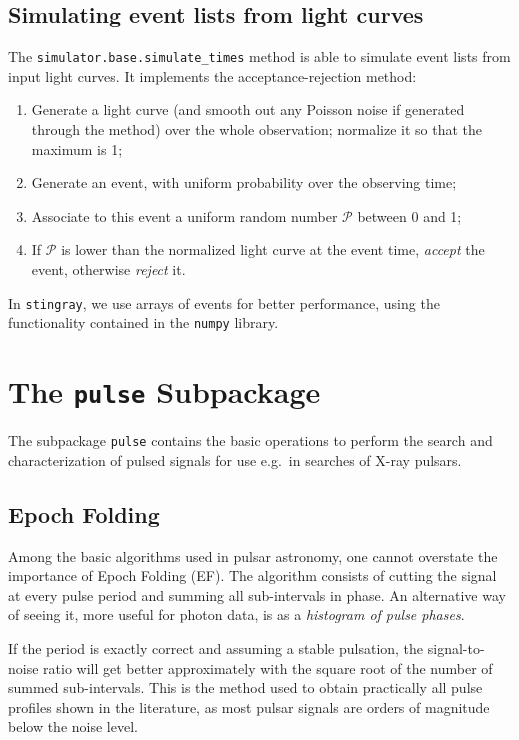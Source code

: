 \documentclass[twocolumn]{aastex62}
\newcommand{\stingray}{\texttt{stingray}\xspace}
\begin{document}
\subsection{Simulating event lists from light curves}
The \texttt{simulator.base.simulate\_times} method is able to simulate event lists from input light curves.
It implements the acceptance-rejection method: 
\begin{enumerate}
\item Generate a light curve (and smooth out any Poisson noise if generated through the \citealt{timmer1995} method) over the whole observation; normalize it so that the maximum is 1; 
\item Generate an event, with uniform probability over the observing time; 
\item Associate to this event a uniform random number $\mathcal{P}$ between 0 and 1; 
\item If $\mathcal{P}$ is lower than the normalized light curve at the event time, \textit{accept} the event, otherwise \textit{reject} it.
\end{enumerate}
In \stingray, we use arrays of events for better performance, using the functionality contained in the \texttt{numpy} library.


\section{The \texttt{pulse} Subpackage}
\label{sec:pulsar}
The subpackage \texttt{pulse} contains the basic operations to perform the search and characterization of pulsed signals for use e.g.\ in searches of X-ray pulsars.

\subsection{Epoch Folding}
Among the basic algorithms used in pulsar astronomy, one cannot overstate the importance of Epoch Folding (EF).
The algorithm consists of cutting the signal at every pulse period and summing all sub-intervals in phase. 
An alternative way of seeing it, more useful for photon data, is as a \textit {histogram of pulse phases}.

If the period is exactly correct and assuming a stable pulsation, the signal-to-noise ratio will get better approximately with the square root of the number of summed sub-intervals.
This is the method used to obtain practically all pulse profiles shown in the literature, as most pulsar signals are orders of magnitude below the noise level.
\end{document}
